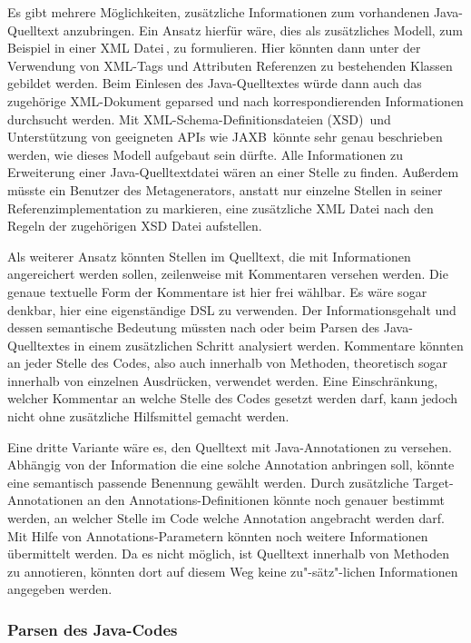 \documentclass[12pt,oneside,a4paper,parskip]{scrbook}
\begin{document}
Es gibt mehrere Möglichkeiten, zusätzliche Informationen zum vorhandenen Java-Quelltext anzubringen. Ein Ansatz hierfür wäre, dies als zusätzliches Modell, zum Beispiel in einer XML Datei\,\cite{xml2008}, zu formulieren. Hier könnten dann unter der Verwendung von XML-Tags und Attributen Referenzen zu bestehenden Klassen gebildet werden. Beim Einlesen des Java-Quelltextes würde dann auch das zugehörige XML-Dokument geparsed und nach korrespondierenden Informationen durchsucht werden. Mit XML-Schema-Definitionsdateien (XSD)\,\cite{xsd2012} und Unterstützung von geeigneten APIs wie JAXB\,\cite{jaxb} könnte sehr genau beschrieben werden, wie dieses Modell aufgebaut sein dürfte. Alle Informationen zu Erweiterung einer Java-Quelltextdatei wären an einer Stelle zu finden. Außerdem müsste ein Benutzer des Metagenerators, anstatt nur einzelne Stellen in seiner Referenzimplementation zu markieren, eine zusätzliche XML Datei nach den Regeln der zugehörigen XSD Datei aufstellen.

Als weiterer Ansatz könnten Stellen im Quelltext, die mit Informationen angereichert werden sollen, zeilenweise mit Kommentaren versehen werden. Die genaue textuelle Form der Kommentare ist hier frei wählbar. Es wäre sogar denkbar, hier eine eigenständige DSL zu verwenden. Der Informationsgehalt und dessen semantische Bedeutung müssten nach oder beim Parsen des Java-Quelltextes in einem zusätzlichen Schritt analysiert werden. Kommentare könnten an jeder Stelle des Codes, also auch innerhalb von Methoden, theoretisch sogar innerhalb von einzelnen Ausdrücken, verwendet werden. Eine Einschränkung, welcher Kommentar an welche Stelle des Codes gesetzt werden darf, kann jedoch nicht ohne zusätzliche Hilfsmittel gemacht werden.

Eine dritte Variante wäre es, den Quelltext mit Java-Annotationen zu versehen. Abhängig von der Information die eine solche Annotation anbringen soll, könnte eine semantisch passende Benennung gewählt werden. Durch zusätzliche Target-Annotationen an den Annotations-Definitionen könnte noch genauer bestimmt werden, an welcher Stelle im Code welche Annotation angebracht werden darf. Mit Hilfe von Annotations-Parametern könnten noch weitere Informationen übermittelt werden. Da es nicht möglich, ist Quelltext innerhalb von Methoden zu annotieren, könnten dort auf diesem Weg keine zu"-sätz"-lichen Informationen angegeben werden.

\subsubsection{Parsen des Java-Codes}
\end{document}
